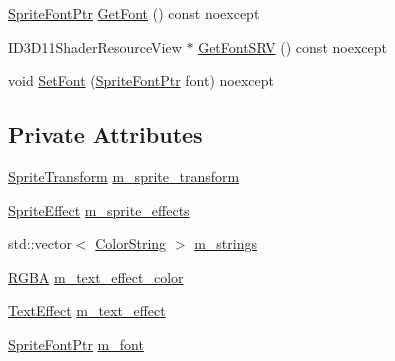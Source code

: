 \begin{DoxyCompactItemize}
\item 
\mbox{\hyperlink{namespacemage_1_1rendering_ab2f34196c20422ca3692ad3f3bff3a5d}{Sprite\+Font\+Ptr}} \mbox{\hyperlink{classmage_1_1rendering_1_1_sprite_text_a4ec33c106762e7f8d4d04cde0bf03669}{Get\+Font}} () const noexcept
\item 
I\+D3\+D11\+Shader\+Resource\+View $\ast$ \mbox{\hyperlink{classmage_1_1rendering_1_1_sprite_text_af9e6eb6e62d9c638dc86a7a978524aa9}{Get\+Font\+S\+RV}} () const noexcept
\item 
void \mbox{\hyperlink{classmage_1_1rendering_1_1_sprite_text_acad93e0803d47502db5ef16998d2f38a}{Set\+Font}} (\mbox{\hyperlink{namespacemage_1_1rendering_ab2f34196c20422ca3692ad3f3bff3a5d}{Sprite\+Font\+Ptr}} font) noexcept
\end{DoxyCompactItemize}
\subsection*{Private Attributes}
\begin{DoxyCompactItemize}
\item 
\mbox{\hyperlink{classmage_1_1_sprite_transform}{Sprite\+Transform}} \mbox{\hyperlink{classmage_1_1rendering_1_1_sprite_text_af702fbdab6468fbd5856434192a32787}{m\+\_\+sprite\+\_\+transform}}
\item 
\mbox{\hyperlink{namespacemage_1_1rendering_a4dbc3536c87b906f1d41d863ec458e78}{Sprite\+Effect}} \mbox{\hyperlink{classmage_1_1rendering_1_1_sprite_text_a49995d4b435446b48d2d112113834f23}{m\+\_\+sprite\+\_\+effects}}
\item 
std\+::vector$<$ \mbox{\hyperlink{classmage_1_1rendering_1_1_color_string}{Color\+String}} $>$ \mbox{\hyperlink{classmage_1_1rendering_1_1_sprite_text_a2f9d4a00ad08710fe36eebd825b2f142}{m\+\_\+strings}}
\item 
\mbox{\hyperlink{structmage_1_1_r_g_b_a}{R\+G\+BA}} \mbox{\hyperlink{classmage_1_1rendering_1_1_sprite_text_a2fffa5ce343b92f32cbfe5234b182247}{m\+\_\+text\+\_\+effect\+\_\+color}}
\item 
\mbox{\hyperlink{classmage_1_1rendering_1_1_sprite_text_af07ecf28d2ab8997c011cab74e799ef7}{Text\+Effect}} \mbox{\hyperlink{classmage_1_1rendering_1_1_sprite_text_a795a35dc3671097dd29afaa4b2c5ac3a}{m\+\_\+text\+\_\+effect}}
\item 
\mbox{\hyperlink{namespacemage_1_1rendering_ab2f34196c20422ca3692ad3f3bff3a5d}{Sprite\+Font\+Ptr}} \mbox{\hyperlink{classmage_1_1rendering_1_1_sprite_text_ad682901cbe866d2dc316bf3238812d25}{m\+\_\+font}}
\end{DoxyCompactItemize}
